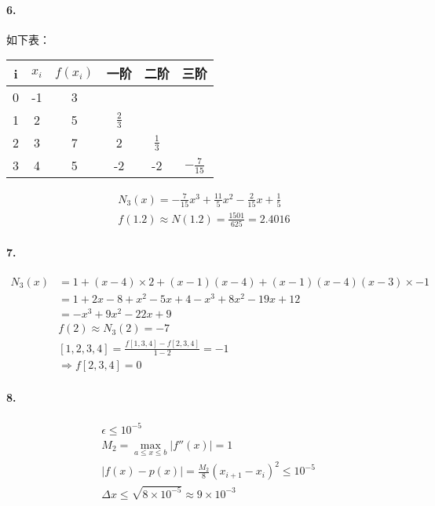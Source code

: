\documentclass[UTF8]{ctexart}
\begin{document}
	\paragraph{6.}
		如下表：
		\begin{table}[h]
			\centering
			\begin{tabular}{|c|c|c|c|c|c|}\hline
				i&$x_i$&$f(x_i)$&一阶&二阶&三阶\\\hline
				0&-1&3&&&\\
				1&2&5&$\frac{2}{3}$&&\\
				2&3&7&2&$\frac{1}{3}$&\\
				3&4&5&-2&-2&$-\frac{7}{15}$\\\hline
			\end{tabular}
		\end{table}
		\begin{displaymath}
		\begin{aligned}
			N_3(x)=-\frac{7}{15}x^3+\frac{11}{5}x^2-\frac{2}{15}x+\frac{1}{5}\\
			f(1.2)\approx N(1.2)=\frac{1501}{625}=2.4016
		\end{aligned}
		\end{displaymath}
	
	\paragraph{7.}
		\begin{displaymath}
		\begin{aligned}
			N_3(x)&=1+(x-4)\times2+(x-1)(x-4)+(x-1)(x-4)(x-3)\times-1\\
				  &=1+2x-8+x^2-5x+4-x^3+8x^2-19x+12\\
				  &=-x^3+9x^2-22x+9\\
			&f(2)\approx N_3(2)=-7\\
			&[1,2,3,4]=\frac{f[1,3,4]-f[2,3,4]}{1-2}=-1\\
			&\Rightarrow f[2,3,4]=0
		\end{aligned}
		\end{displaymath}
	
	\paragraph{8.}
		\begin{displaymath}
		\begin{aligned}
			&\epsilon \le 10^{-5}\\
			&M_2=\max \limits_{a\leq x\leq b}|f''(x)|=1\\
			&|f(x)-p(x)|=\frac{M_2}{8}(x_{i+1}-x_i)^2\leq 10^{-5}\\
			&\Delta x\leq \sqrt{8\times 10^{-5}} \approx 9\times 10^{-3}\\
		\end{aligned}
		\end{displaymath}
	
\end{document}
